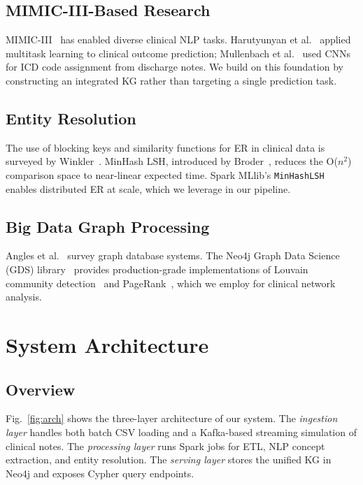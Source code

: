 \documentclass[conference]{IEEEtran}
\begin{document}
\subsection{MIMIC-III-Based Research}
MIMIC-III~\cite{mimic3} has enabled diverse clinical NLP tasks.
Harutyunyan et al.~\cite{harutyunyan2019multitask} applied multitask learning to
clinical outcome prediction; Mullenbach et al.~\cite{mullenbach2018explainable}
used CNNs for ICD code assignment from discharge notes.
We build on this foundation by constructing an integrated KG rather than
targeting a single prediction task.

\subsection{Entity Resolution}
The use of blocking keys and similarity functions for ER in clinical data is
surveyed by Winkler~\cite{winkler2006overview}.
MinHash LSH, introduced by Broder~\cite{broder1997resemblance}, reduces the
O($n^2$) comparison space to near-linear expected time.
Spark MLlib's \texttt{MinHashLSH} enables distributed ER at scale, which we
leverage in our pipeline.

\subsection{Big Data Graph Processing}
Angles et al.~\cite{angles2018introduction} survey graph database systems.
The Neo4j Graph Data Science (GDS) library~\cite{neo4j_gds} provides
production-grade implementations of Louvain community detection~\cite{blondel2008fast}
and PageRank~\cite{pagerank}, which we employ for clinical network analysis.

\section{System Architecture}

\subsection{Overview}

Fig.~\ref{fig:arch} shows the three-layer architecture of our system.
The \textit{ingestion layer} handles both batch CSV loading and a
Kafka-based streaming simulation of clinical notes.
The \textit{processing layer} runs Spark jobs for ETL, NLP concept extraction,
and entity resolution.
The \textit{serving layer} stores the unified KG in Neo4j and exposes
Cypher query endpoints.
\end{document}
